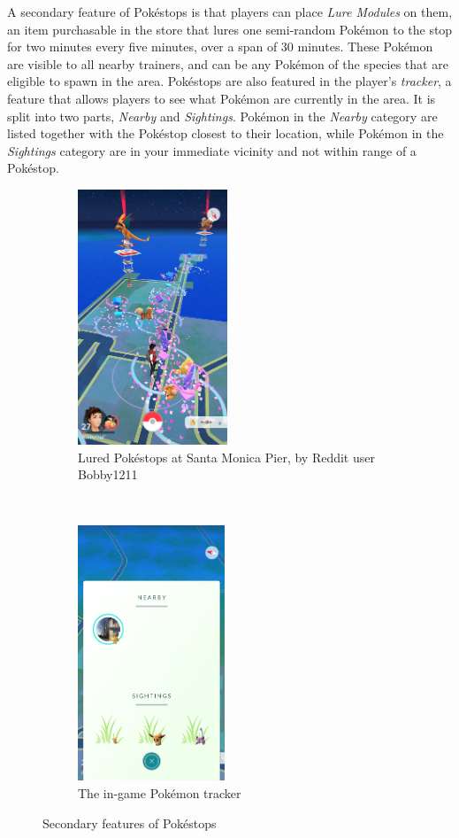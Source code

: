 A secondary feature of Pokéstops is that players can place \emph{Lure Modules} on them, an item purchasable in the store that lures one semi-random Pokémon to the stop for two minutes every five minutes, over a span of 30 minutes. These Pokémon are visible to all nearby trainers, and can be any Pokémon of the species that are eligible to spawn in the area. Pokéstops are also featured in the player's \emph{tracker}, a feature that allows players to see what Pokémon are currently in the area. It is split into two parts, \emph{Nearby} and \emph{Sightings}. Pokémon in the \emph{Nearby} category are listed together with the Pokéstop closest to their location, while Pokémon in the \emph{Sightings} category are in your immediate vicinity and not within range of a Pokéstop.

\begin{figure}[h]
	\centering
	\begin{subfigure}[t]{0.45\textwidth}
		\centering
		\includegraphics[height=3in]{Figures/pogo-santa-monica-lures-bobby1211}
		\caption{Lured Pokéstops at Santa Monica Pier, by Reddit user Bobby1211}
	\end{subfigure}
	~
	\begin{subfigure}[t]{0.45\textwidth}
		\centering
		\includegraphics[height=3in]{Figures/pogo-tracker}
		\caption{The in-game Pokémon tracker}
	\end{subfigure}
	\caption{Secondary features of Pokéstops}
\end{figure}


